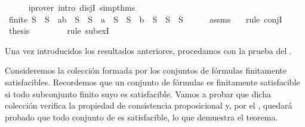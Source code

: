 \begin{isabellebody}
\ \ \ \ \isamarkupfalse%
\ {\isacharparenleft}iprover\ intro{\isacharcolon}\ disjI{}\ simp{\isacharunderscore}thms{\isacharparenright}\isanewline
\ \ \isamarkupfalse%
\ {\isachardoublequoteopen}finite\ S\ {\isasymand}\ {\isacharparenleft}S\ {\isacharequal}\ {\isacharbraceleft}a{\isacharcomma}b{\isacharbraceright}\ {\isasymunion}\ S\ {\isasymor}\ S\ {\isacharequal}\ {\isacharbraceleft}a{\isacharbraceright}\ {\isasymunion}\ S\ {\isasymor}\ S\ {\isacharequal}\ {\isacharbraceleft}b{\isacharbraceright}\ {\isasymunion}\ S\ {\isasymor}\ S\ {\isacharequal}\ S{\isacharparenright}{\isachardoublequoteclose}\isanewline
\ \ \ \ \isamarkupfalse%
\ assms{\isacharparenleft}{}{\isacharparenright}\ {}\ \isamarkupfalse%
\ {\isacharparenleft}rule\ conjI{\isacharparenright}\isanewline
\ \ \isamarkupfalse%
\ {\isacharquery}thesis\isanewline
\ \ \ \ \isamarkupfalse%
\ {}\ \isamarkupfalse%
\ {\isacharparenleft}rule\ subexI{\isacharparenright}\isanewline
{}\isamarkupfalse%
%
\endisatagproof
{\isafoldproof}%
%
\isadelimproof
%
\endisadelimproof
%
\begin{isamarkuptext}%
Una vez introducidos los resultados anteriores, procedamos con la prueba del .

  \begin{demostracion}
    Consideremos la colección  formada por los conjuntos de fórmulas finitamente satisfacibles.
    Recordemos que un conjunto de fórmulas es finitamente satisfacible si todo subconjunto finito 
    suyo es satisfacible. Vamos a probar que dicha colección verifica la propiedad de consistencia 
    proposicional y, por el , quedará probado que todo conjunto de 
     es satisfacible, lo que demuestra el teorema.


\end{demostracion}
\end{isamarkuptext}
\end{isabellebody}
